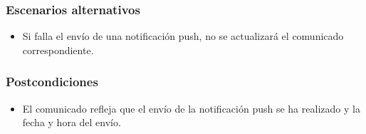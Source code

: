 \subsubsection*{Escenarios alternativos}
\begin{itemize}
    \item Si falla el envío de una notificación push, no se actualizará el comunicado correspondiente.
\end{itemize}

\subsubsection*{Postcondiciones}
\begin{itemize}
    \item El comunicado refleja que el envío de la notificación push se ha realizado y la fecha y hora del envío.
\end{itemize}